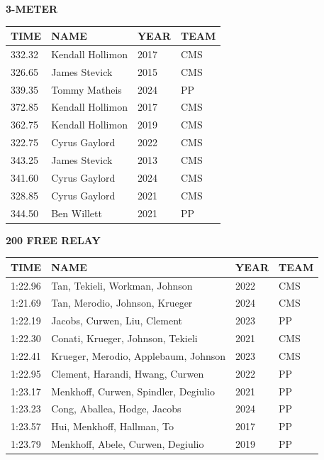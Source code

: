 \begin{table}[H]
\centering
\begin{minipage}[t]{0.6\textwidth}
\centering
\textbf{3-METER}\\[0.1cm]
\begin{tabular}{@{}p{1.8cm}p{2.8cm}p{1.2cm}p{1.4cm}@{}}
\hline
    \textbf{TIME} & \textbf{NAME} & \textbf{YEAR} & \textbf{TEAM} \\
\hline
    332.32 & Kendall Hollimon & 2017 & CMS \\
    326.65 & James Stevick & 2015 & CMS \\
    339.35 & Tommy Matheis & 2024 & PP \\
    372.85 & Kendall Hollimon & 2017 & CMS \\
    362.75 & Kendall Hollimon & 2019 & CMS \\
    322.75 & Cyrus Gaylord & 2022 & CMS \\
    343.25 & James Stevick & 2013 & CMS \\
    341.60 & Cyrus Gaylord & 2024 & CMS \\
    328.85 & Cyrus Gaylord & 2021 & CMS \\
    344.50 & Ben Willett & 2021 & PP \\
\hline
\end{tabular}
\end{minipage}
\end{table}

\begin{table}[H]
\centering
\begin{minipage}[t]{0.6\textwidth}
\centering
\textbf{200 FREE RELAY}\\[0.1cm]
\begin{tabular}{@{}p{1.8cm}p{2.8cm}p{1.2cm}p{1.4cm}@{}}
\hline
    \textbf{TIME} & \textbf{NAME} & \textbf{YEAR} & \textbf{TEAM} \\
\hline
    1:22.96 & Tan, Tekieli, Workman, Johnson & 2022 & CMS \\
    1:21.69 & Tan, Merodio, Johnson, Krueger & 2024 & CMS \\
    1:22.19 & Jacobs, Curwen, Liu, Clement & 2023 & PP \\
    1:22.30 & Conati, Krueger, Johnson, Tekieli & 2021 & CMS \\
    1:22.41 & Krueger, Merodio, Applebaum, Johnson & 2023 & CMS \\
    1:22.95 & Clement, Harandi, Hwang, Curwen & 2022 & PP \\
    1:23.17 & Menkhoff, Curwen, Spindler, Degiulio & 2021 & PP \\
    1:23.23 & Cong, Aballea, Hodge, Jacobs & 2024 & PP \\
    1:23.57 & Hui, Menkhoff, Hallman, To & 2017 & PP \\
    1:23.79 & Menkhoff, Abele, Curwen, Degiulio & 2019 & PP \\
\hline
\end{tabular}
\end{minipage}
\end{table}

